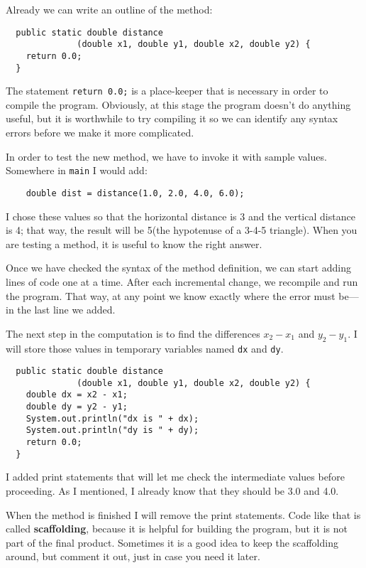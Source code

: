 \documentclass{book}
\begin{document}
Already we can write an outline of the method:

\begin{verbatim}
  public static double distance
              (double x1, double y1, double x2, double y2) {
    return 0.0;
  }
\end{verbatim}
%
The statement {\tt return 0.0;} is a place-keeper that is necessary
in order to compile the program.  Obviously, at this stage the
program doesn't do anything useful, but it is worthwhile to
try compiling it so we can identify any syntax errors before
we make it more complicated.

In order to test the new method, we have to invoke it with
sample values.  Somewhere in {\tt main} I would add:

\begin{verbatim}
    double dist = distance(1.0, 2.0, 4.0, 6.0);
\end{verbatim}
%
I chose these values so that the horizontal
distance is 3 and the vertical distance is 4; that way,
the result will be 5(the hypotenuse of a 3-4-5 triangle).
When you are testing a method, it is useful to know the right
answer.

Once we have checked the syntax of the method definition, we
can start adding lines of code one at a time.  After each
incremental change, we recompile and run the program.  That
way, at any point we know exactly where the error must be---in
the last line we added.

The next step in the computation is to find the differences
$x_2 - x_1$ and $y_2 - y_1$.  I will store those values in
temporary variables named {\tt dx} and {\tt dy}.

\begin{verbatim}
  public static double distance
              (double x1, double y1, double x2, double y2) {
    double dx = x2 - x1;
    double dy = y2 - y1;
    System.out.println("dx is " + dx);
    System.out.println("dy is " + dy);
    return 0.0;
  }
\end{verbatim}
%
I added print statements that will let me check the intermediate
values before proceeding.  As I mentioned, I already know that they
should be 3.0 and 4.0.


When the method is finished I will remove the print statements.  Code
like that is called {\bf scaffolding}, because it is helpful for
building the program, but it is not part of the final product.
Sometimes it is a good idea to keep the scaffolding around, but
comment it out, just in case you need it later.
\end{document}
